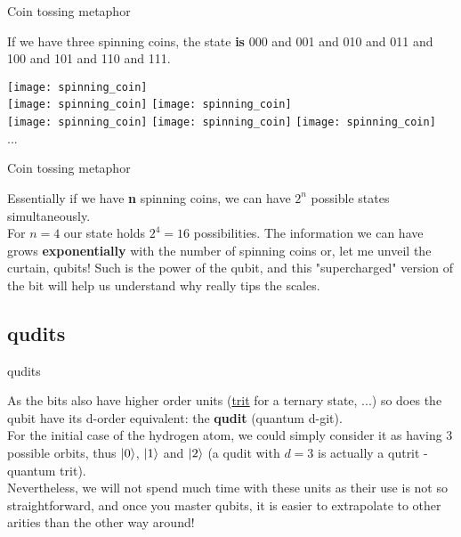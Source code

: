 \documentclass[aspectratio=43]{beamer}
\begin{document}
\begin{frame}{Coin tossing metaphor}
	\begin{cardTiny}
		If we have three spinning coins, the state \textbf{is} 000 and 001 and 010 and 011 and 100 and 101 and 110 and 111.
	\end{cardTiny}
    \begin{center}
        \texttt{[image: spinning\_coin]}\\
        \texttt{[image: spinning\_coin]}
        \texttt{[image: spinning\_coin]}\\
        \texttt{[image: spinning\_coin]}
        \texttt{[image: spinning\_coin]}
        \texttt{[image: spinning\_coin]}\\...
	\end{center}
\pagenumber
\end{frame}

\begin{frame}{Coin tossing metaphor}
	\begin{card}
		Essentially if we have \textbf{n} spinning coins, we can have  \textbf{$2^n$} possible states simultaneously.\\
		For $n=4$ our state holds $2^4=16$ possibilities. The information we can have grows \textbf{exponentially} with the number of spinning coins or, let me unveil the curtain, qubits! Such is the power of the qubit, and this "supercharged" version of the bit will help us understand why \qc really tips the scales.
	\end{card}
\pagenumber
\end{frame}

\subsection{qudits}
\begin{frame}{qudits}
    \begin{card}[Curiosity*]
        As the bits also have higher order units (\href{https://en.wikipedia.org/wiki/Ternary_numeral_system}{trit} for a ternary state, ...) so does the qubit have its d-order equivalent: the \textbf{qudit} (quantum d-git).\\
        For the initial case of the hydrogen atom, we could simply consider it as having 3 possible orbits, thus $\ket{0}$, $\ket{1}$ and $\ket{2}$ (a qudit with $d=3$ is actually a qutrit - quantum trit).\\
        Nevertheless, we will not spend much time with these units as their use is not so straightforward, and once you master qubits, it is easier to extrapolate to other arities than the other way around!
    \end{card}
\pagenumber
\end{frame}
\end{document}
